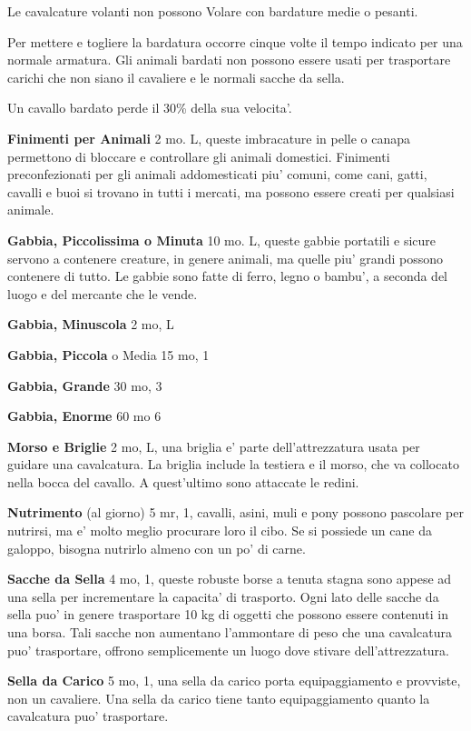 \documentclass[a4paper,11pt,twoside,openany]{book}
\begin{document}
{		Le cavalcature volanti non possono Volare con bardature medie o pesanti.
		
		Per mettere e togliere la bardatura occorre cinque volte il tempo indicato per una normale armatura. Gli animali bardati non possono essere usati per trasportare carichi che non siano il cavaliere e le normali sacche da sella.
		
		Un cavallo bardato perde il 30\% della sua velocita'.
		
		\textbf{Finimenti per Animali} 2 mo. L, queste imbracature in pelle o canapa permettono di bloccare e controllare gli animali domestici. Finimenti preconfezionati per gli animali addomesticati piu' comuni, come cani, gatti, cavalli e buoi si trovano in tutti i mercati, ma possono essere creati per qualsiasi animale.
		
		\textbf{Gabbia, Piccolissima o Minuta} 10 mo. L, queste gabbie portatili e sicure servono a contenere creature, in genere animali, ma quelle piu' grandi possono contenere di tutto. Le gabbie sono fatte di ferro, legno o bambu', a seconda del luogo e del mercante che le vende. 
		
		\textbf{Gabbia, Minuscola} 2 mo, L
		
		\textbf{Gabbia, Piccola} o Media 15 mo, 1
		
		\textbf{Gabbia, Grande} 30 mo, 3
		
		\textbf{Gabbia, Enorme} 60 mo 6
		
		\textbf{Morso e Briglie} 2 mo, L, una briglia e' parte dell'attrezzatura usata per guidare una cavalcatura. La briglia include la testiera e il morso, che va collocato nella bocca del cavallo. A quest'ultimo sono attaccate le redini.
		
		\textbf{Nutrimento} (al giorno) 5 mr,  1, cavalli, asini, muli e pony possono pascolare per nutrirsi, ma e' molto meglio procurare loro il cibo. Se si possiede un cane da galoppo, bisogna nutrirlo almeno con un po' di carne.
		
		\textbf{Sacche da Sella} 4 mo, 1, queste robuste borse a tenuta stagna sono appese ad una sella per incrementare la capacita' di trasporto.
		Ogni lato delle sacche da sella puo' in genere trasportare 10 kg di oggetti che possono essere contenuti in una borsa.
		Tali sacche non aumentano l'ammontare di peso che una cavalcatura puo' trasportare, offrono semplicemente un luogo dove stivare dell'attrezzatura.
		
		\textbf{Sella da Carico} 5 mo, 1, una sella da carico porta equipaggiamento e provviste, non un cavaliere. Una sella da carico tiene tanto equipaggiamento quanto la cavalcatura puo' trasportare.
		
}
\end{document}
